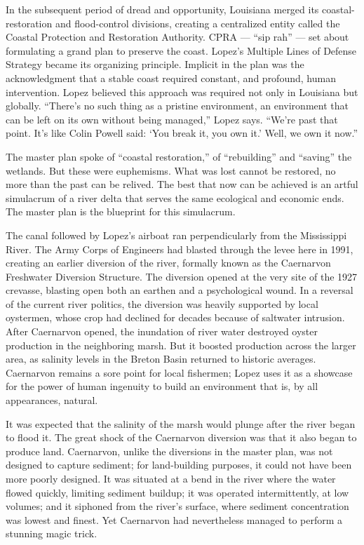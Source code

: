 In the subsequent period of dread and opportunity, Louisiana merged its
coastal-restoration and flood-control divisions, creating a centralized
entity called the Coastal Protection and Restoration Authority. CPRA ---
``sip rah'' --- set about formulating a grand plan to preserve the
coast. Lopez's Multiple Lines of Defense Strategy became its organizing
principle. Implicit in the plan was the acknowledgment that a stable
coast required constant, and profound, human intervention. Lopez
believed this approach was required not only in Louisiana but globally.
``There's no such thing as a pristine environment, an environment that
can be left on its own without being managed,'' Lopez says. ``We're past
that point. It's like Colin Powell said: `You break it, you own it.'
Well, we own it now.''

The master plan spoke of ``coastal restoration,'' of ``rebuilding'' and
``saving'' the wetlands. But these were euphemisms. What was lost cannot
be restored, no more than the past can be relived. The best that now can
be achieved is an artful simulacrum of a river delta that serves the
same ecological and economic ends. The master plan is the blueprint for
this simulacrum.

The canal followed by Lopez's airboat ran perpendicularly from the
Mississippi River. The Army Corps of Engineers had blasted through the
levee here in 1991, creating an earlier diversion of the river, formally
known as the Caernarvon Freshwater Diversion Structure. The diversion
opened at the very site of the 1927 crevasse, blasting open both an
earthen and a psychological wound. In a reversal of the current river
politics, the diversion was heavily supported by local oystermen, whose
crop had declined for decades because of saltwater intrusion. After
Caernarvon opened, the inundation of river water destroyed oyster
production in the neighboring marsh. But it boosted production across
the larger area, as salinity levels in the Breton Basin returned to
historic averages. Caernarvon remains a sore point for local fishermen;
Lopez uses it as a showcase for the power of human ingenuity to build an
environment that is, by all appearances, natural.

It was expected that the salinity of the marsh would plunge after the
river began to flood it. The great shock of the Caernarvon diversion was
that it also began to produce land. Caernarvon, unlike the diversions in
the master plan, was not designed to capture sediment; for land-building
purposes, it could not have been more poorly designed. It was situated
at a bend in the river where the water flowed quickly, limiting sediment
buildup; it was operated intermittently, at low volumes; and it siphoned
from the river's surface, where sediment concentration was lowest and
finest. Yet Caernarvon had nevertheless managed to perform a stunning
magic trick.

